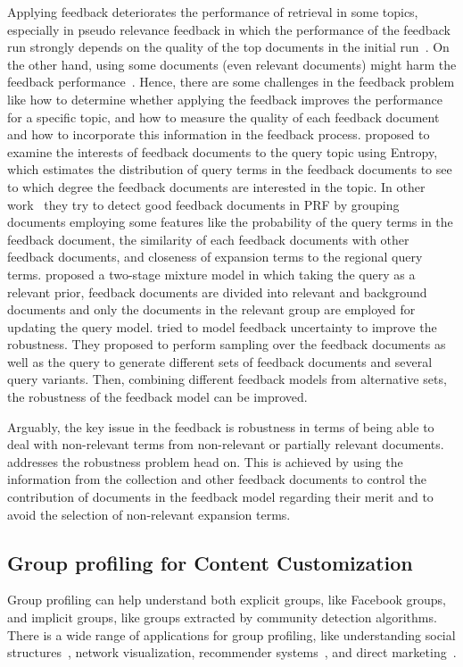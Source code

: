 Applying feedback deteriorates the performance of retrieval in some topics, especially in pseudo relevance feedback in which the performance of the feedback run strongly depends on the quality of the top documents in the initial run~\citep{Harman:2009,Collins-Thompson:2009}. 
On the other hand, using some documents (even relevant documents) might harm the feedback performance~\citep{Terra:2005,Lv:2009:CIKM}.  
Hence, there are some challenges in the feedback problem like how to determine whether applying the feedback improves the performance for a specific topic, and how to measure the quality of each feedback document and how to incorporate this information in the feedback process.
%
\citet{He:2009:CIKM} proposed to examine the interests of feedback documents to the query topic using Entropy, which estimates the distribution of query terms in the feedback documents to see to which degree the feedback documents are interested in the topic.  In other work~\citep{He:2009:ECIR} they try to detect good feedback documents in PRF by grouping documents employing some features like the probability of the query terms in the feedback document, the similarity of each feedback documents with other feedback documents, and closeness of expansion terms to the regional query terms. 
\citet{Tao:2004} proposed a two-stage mixture model in which taking the query as a relevant prior, feedback documents are divided into relevant and background documents and only the documents in the relevant group are employed for updating the query model. 
\citet{Collins-Thompson:2007} tried to model feedback uncertainty to improve the robustness. They proposed to perform sampling over the feedback documents as well as the query to generate different sets of feedback documents and several query variants. Then, combining different feedback models from alternative sets, the robustness of the feedback model can be improved.

\medskip
Arguably, the key issue in the feedback is robustness in terms of being able to deal with non-relevant terms from non-relevant or partially relevant documents. \acswlm addresses the robustness problem head on. This is achieved by using the information from the collection and other feedback documents to control the contribution of documents in the feedback model regarding their merit and to avoid the selection of non-relevant expansion terms.

\subsection{Group profiling for Content Customization}
Group profiling can help understand both explicit groups, like Facebook groups, and implicit groups, like groups extracted by community detection algorithms. There is a wide range of applications for group profiling, like understanding social structures~\citep{Tang:2011}, network visualization, recommender systems~\citep{Hu:2014,Shang:2014,Amer-Yahia}, and direct marketing~\citep{Custers:2003}. 

